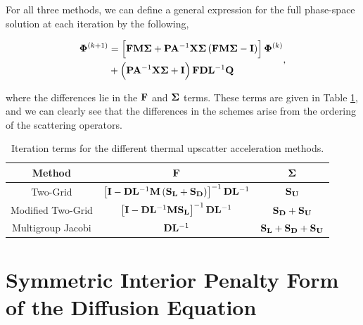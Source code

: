 For all three methods, we can define a general expression for the full phase-space solution at each iteration by the following,

\begin{equation}
\label{eq::DSA_MG_Summary_form}
\begin{aligned}
{\bf \Phi}^{(k+1)} &= \left[ {\bf F} {\bf M} {\bf \Sigma} + {\bf P} {\bf A}^{-1}  {\bf X} {\bf \Sigma} \left(  {\bf F} {\bf M} {\bf \Sigma} - {\bf I} \right)  \right]   {\bf \Phi}^{(k)} \\
&+ \left(  {\bf P} {\bf A}^{-1}  {\bf X} {\bf \Sigma}  + {\bf I} \right) {\bf F} {\bf D}{\bf L}^{-1}  {\bf Q}
\end{aligned} ,
\end{equation}

\noindent where the differences lie in the ${\bf F}$ and  ${\bf \Sigma}$ terms. These terms are given in Table \ref{tab::DSA_DSA_MG_Summary_diffterms}, and we can clearly see that the differences in the schemes arise from the ordering of the scattering operators.

\begin{table}[hbt]
\centering
\caption{Iteration terms for the different thermal upscatter acceleration methods.}
\def\arraystretch{1.4}
\begin{tabular}{|c||c|c|} \hline
Method & ${\bf F}$ & ${\bf \Sigma}$ \\ \hline \hline
Two-Grid & $\left[ {\bf I} - {\bf D}{\bf L}^{-1} {\bf M} \left(  {\bf S_L} + {\bf S_D} \right) \right]^{-1} {\bf D}{\bf L}^{-1}$ & ${\bf S_{U}}$ \\ \hline
Modified Two-Grid & $\left[ {\bf I} - {\bf D}{\bf L}^{-1} {\bf M}{\bf S_L}\right]^{-1} {\bf D}{\bf L}^{-1}$ & ${\bf S_{D}} + {\bf S_{U}}$ \\ \hline
Multigroup Jacobi & ${\bf D}{\bf L}^{-1}$ & ${\bf S_{L}} + {\bf S_{D}} + {\bf S_{U}}$ \\ \hline
\end{tabular}
\label{tab::DSA_DSA_MG_Summary_diffterms}
\end{table}

\section{Symmetric Interior Penalty Form of the Diffusion Equation}
\label{sec::DSA_SIP}

